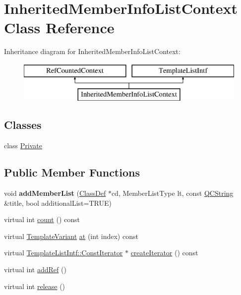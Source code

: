 \hypertarget{class_inherited_member_info_list_context}{}\section{Inherited\+Member\+Info\+List\+Context Class Reference}
\label{class_inherited_member_info_list_context}
Inheritance diagram for Inherited\+Member\+Info\+List\+Context\+:\begin{figure}[H]
\begin{center}
\leavevmode
\includegraphics[height=2.000000cm]{class_inherited_member_info_list_context}
\end{center}
\end{figure}
\subsection*{Classes}
\begin{DoxyCompactItemize}
\item 
class \mbox{\hyperlink{class_inherited_member_info_list_context_1_1_private}{Private}}
\end{DoxyCompactItemize}
\subsection*{Public Member Functions}
\begin{DoxyCompactItemize}
\item 
\mbox{\label{class_inherited_member_info_list_context_aaa7738cb8a48f32c6493926fd2a454f2}} 
void {\bfseries add\+Member\+List} (\mbox{\hyperlink{class_class_def}{Class\+Def}} $\ast$cd, Member\+List\+Type lt, const \mbox{\hyperlink{class_q_c_string}{Q\+C\+String}} \&title, bool additional\+List=T\+R\+UE)
\item 
virtual int \mbox{\hyperlink{class_inherited_member_info_list_context_a89313c333cec39eb147a2b61f2f5252a}{count}} () const
\item 
virtual \mbox{\hyperlink{class_template_variant}{Template\+Variant}} \mbox{\hyperlink{class_inherited_member_info_list_context_aae1d20b1cb3ca2e5e5dfa9b13b734d79}{at}} (int index) const
\item 
virtual \mbox{\hyperlink{class_template_list_intf_1_1_const_iterator}{Template\+List\+Intf\+::\+Const\+Iterator}} $\ast$ \mbox{\hyperlink{class_inherited_member_info_list_context_abe8fbdd088803a1973c3dcf2e62ec608}{create\+Iterator}} () const
\item 
virtual int \mbox{\hyperlink{class_inherited_member_info_list_context_a367a16fa7a17f619910a40778da2af12}{add\+Ref}} ()
\item 
virtual int \mbox{\hyperlink{class_inherited_member_info_list_context_a7a5276e7ac2ff51f66d07715f333cbe7}{release}} ()
\end{DoxyCompactItemize}
